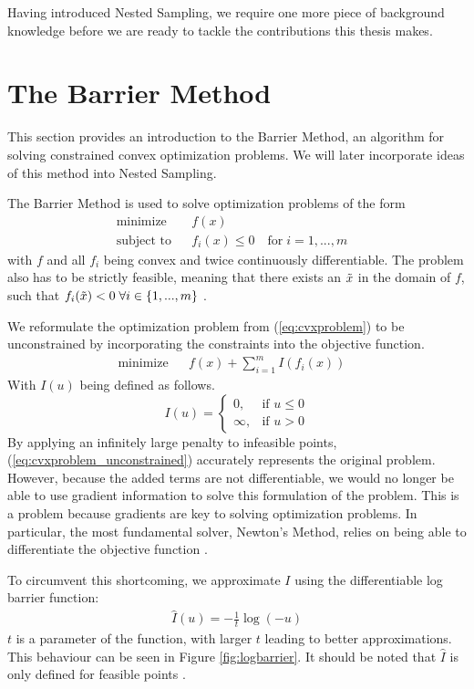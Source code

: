 \documentclass[12pt, a4paper]{report}
\begin{document}
Having introduced Nested Sampling, we require one more piece of background knowledge before we are ready to tackle the contributions this thesis makes.
\FloatBarrier
\section{The Barrier Method}
This section provides an introduction to the Barrier Method, an algorithm for solving constrained convex optimization problems.
We will later incorporate ideas of this method into Nested Sampling.

The Barrier Method is used to solve optimization problems of the form
\begin{align}
    &\textrm{minimize} && f(x) && \nonumber\\
    &\textrm{subject to}  && f_i(x) \leq 0 \quad \textrm{for} \; i=1,...,m &&
    \label{eq:cvxproblem}
\end{align}
with $f$ and all $f_i$ being convex and twice continuously differentiable.
The problem also has to be strictly feasible, meaning that there exists an $\Tilde{x}$ in the domain of $f$, such that $f_i(\Tilde{x}) < 0 \; \forall i \in \{1,...,m\}$ \cite[561]{boyd}.

We reformulate the optimization problem from (\ref{eq:cvxproblem}) to be unconstrained by incorporating the constraints into the objective function.
\begin{align}
    &\textrm{minimize} && f(x) + \sum_{i=1}^m I(f_i(x))&& \label{eq:cvxproblem_unconstrained}
\end{align}
With $I(u)$ being defined as follows.
\begin{equation}
    I(u) = \begin{cases}
        0,      & \text{if }  u \leq 0\\
        \infty, & \text{if }  u > 0
        \end{cases} \label{eq:exact_barrier_function}
\end{equation}
By applying an infinitely large penalty to infeasible points, (\ref{eq:cvxproblem_unconstrained}) accurately represents the original problem.
However, because the added terms are not differentiable, we would no longer be able to use gradient information to solve this formulation of the problem.
This is a problem because gradients are key to solving optimization problems.
In particular, the most fundamental solver, Newton's Method, relies on being able to differentiate the objective function \cite[563]{boyd}.

To circumvent this shortcoming, we approximate $I$ using the differentiable log barrier function:
\begin{align}
    \hat{I}(u)= -\frac{1}{t}\log(-u) \label{eq:log_barrier_function}
\end{align}
$t$ is a parameter of the function, with larger $t$ leading to better approximations.
This behaviour can be seen in Figure \ref{fig:logbarrier}.
It should be noted that $\hat{I}$ is only defined for feasible points \cite[563]{boyd}.
\end{document}

